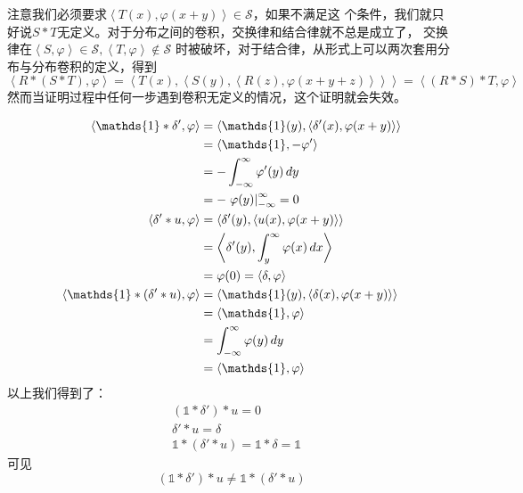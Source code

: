 注意我们必须要求$\left\langle T(x),\varphi(x+y)\right\rangle\in\mathcal{S}$，如果不满足这
个条件，我们就只好说$S*T$无定义。对于分布之间的卷积，交换律和结合律就不总是成立了，
交换律在$\left\langle S,\varphi\right\rangle\in\mathcal{S} ,\left\langle T,\varphi\right\rangle\notin\mathcal{S}$
时被破坏，对于结合律，从形式上可以两次套用分布与分布卷积的定义，得到
\begin{equation*}
    \left\langle R*(S*T),\varphi\right\rangle=\left\langle T(x),\left\langle S(y),\left\langle R(z),\varphi(x+y+z)\right\rangle\right\rangle\right\rangle=\left\langle (R*S)*T,\varphi\right\rangle
\end{equation*}
然而当证明过程中任何一步遇到卷积无定义的情况，这个证明就会失效。
\begin{example}[结合律的失效]
\begin{align*}
    \left\langle\mathds{1}*\delta',\varphi\right\rangle& =\left\langle \mathds{1}(y),\left\langle \delta'(x),\varphi(x+y)\right\rangle\right\rangle\\
    &=\left\langle \mathds{1},-\varphi'\right\rangle\\
    &=-\int_{-\infty}^{\infty}\varphi'(y)\,dy\\
    &=-\evalat{\varphi(y)}{-\infty}{\infty}=0\\
    \left\langle \delta'*u,\varphi\right\rangle&=\left\langle \delta'(y),\left\langle u(x),\varphi(x+y)\right\rangle\right\rangle\\
    &=\left\langle \delta'(y),\int_{y}^{\infty}\varphi(x)\,dx\right\rangle\\
    &=\varphi(0)=\left\langle \delta,\varphi\right\rangle\\
    \left\langle\mathds{1}*(\delta'*u),\varphi\right\rangle&=\left\langle \mathds{1}(y),\left\langle \delta(x),\varphi(x+y)\right\rangle\right\rangle\\
    &=\left\langle \mathds{1},\varphi\right\rangle\\
    &=\int_{-\infty}^{\infty}\varphi(y)\,dy\\
    & =\left\langle \mathds{1},\varphi\right\rangle 
\end{align*}
以上我们得到了：\begin{align*}
    &(\mathds{1}*\delta')*u=0\\
    &\delta'*u=\delta\\
    &\mathds{1}*(\delta'*u)=\mathds{1}*\delta=\mathds{1}
\end{align*}
可见\begin{equation*}
    (\mathds{1}*\delta')*u                       \neq\mathds{1}*(\delta'*u)
\end{equation*}
\end{example}

